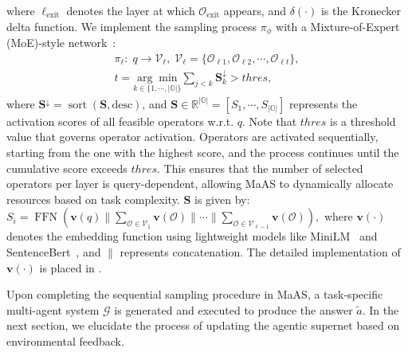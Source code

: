 \documentclass{article}
\theoremstyle{plain}
\theoremstyle{definition}
\theoremstyle{remark}
\newcommand{\ourmethod}{{{MaAS}}\xspace}
\begin{document}
where \(\ell_\text{exit}\) denotes the layer at which \(\mathcal{O}_{\text{exit}}\) appears, and \(\delta(\cdot)\) is the Kronecker delta function. We implement the sampling process $\pi_\phi$ with a Mixture-of-Expert (MoE)-style network~\citep{shazeer2017outrageously,huang2024harder}:
\begin{equation}\begin{gathered}
\label{eq:layer-l}
\pi_\ell:\;q\rightarrow \mathcal{V}_\ell,\; \mathcal{V}_\ell=\{\mathcal{O}_{\ell 1},\mathcal{O}_{\ell 2},\cdots,\mathcal{O}_{\ell t}\},\\
t = \underset{k\in \{1,\cdots,|\mathbb{O}|\}}{\arg \min} \sum_{j<k}\mathbf{S}^\downarrow_{k}>thres,
\end{gathered}
\end{equation}
where \(\mathbf{S}^\downarrow = \operatorname{sort}(\mathbf{S}, \text{desc})\), and \(\mathbf{S} \in \mathbb{R}^{|\mathbb{O}|} = [S_1, \cdots, S_{|\mathbb{O}|}]\) represents the activation scores of all feasible operators w.r.t. \(q\). Note that \(thres\) is a threshold value that governs operator activation. Operators are activated sequentially, starting from the one with the highest score, and the process continues until the cumulative score exceeds \(thres\). This ensures that the number of selected operators per layer is query-dependent, allowing \ourmethod to dynamically allocate resources based on task complexity.  
\(\mathbf{S}\) is given by: $
S_i = \operatorname{FFN}(\mathbf{v}(q) \| \sum_{\mathcal{O} \in \mathcal{V}_1} \mathbf{v}(\mathcal{O}) \| \cdots \| \sum_{\mathcal{O} \in \mathcal{V}_{\ell - 1}} \mathbf{v}(\mathcal{O})),$
where \(\mathbf{v}(\cdot)\) denotes the embedding function using lightweight models like MiniLM~\citep{wang2020minilm} and SentenceBert~\citep{reimers2019sentence}, and \(\|\) represents concatenation. The detailed implementation of $\mathbf{v}(\cdot)$ is placed in .

Upon completing the sequential sampling procedure in \ourmethod, a task-specific multi-agent system \(\mathcal{G}\) is generated and executed to produce the answer \(\widetilde{a}\). In the next section, we elucidate the process of updating the agentic supernet based on environmental feedback.


\end{document}
